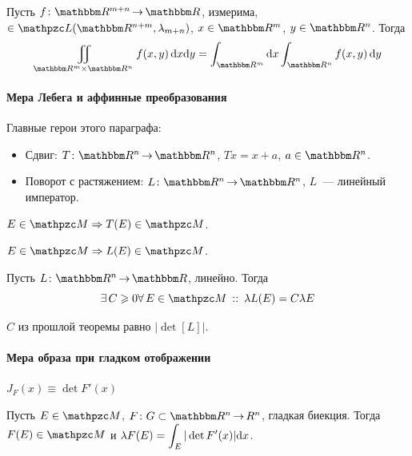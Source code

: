 \documentclass[draft, timbord]{longnotes}
\begin{document}
\begin{thrm}[Фубини]\label{thrm:meas::mult::fub}
  Пусть $f\colon \R^{m+n} \to \R$, измерима, $\in \summb(\R^{n+m}, \lambda_{m+n})$,
  $x\in \R^m$, $y \in \R^n$. Тогда
  \[
    \iint_{\R^m \times \R^n} f(x,y) \, \del x\del y 
    = \int_{\R^m} \del x \int_{\R^n} f(x,y) \, \del y
  \]
\end{thrm}

\paragraph{Мера Лебега и аффинные преобразования}
\label{par:meas::aff}

Главные герои этого параграфа:

\begin{itemize}[$\bigcirc$]
  \item Сдвиг: $T \colon \R^n \to \R^n$, $Tx = x+a$, $a\in \R^n$.
  \item Поворот с растяжением: $L \colon \R^n \to \R^n$, $L$~--- линейный император.
\end{itemize}

\begin{stat}\label{stat:meas::aff::shiftmeas}
  $E \in \lebesgue \Rightarrow T(E) \in \lebesgue$. 
\end{stat}
\begin{stat}\label{stat:meas::aff::linmeas}
  $E \in \lebesgue \Rightarrow L(E) \in \lebesgue$. 
\end{stat}

\begin{stat}\label{stat:meas::aff::disturb}
  Пусть $L \colon \R^n \to \R$, линейно. Тогда 
  \[
    \exists\, C \geqslant 0 \forall\, E \in \lebesgue \holds \lambda L(E) = C \lambda E
  \]
\end{stat}

\begin{thrm}\label{thrm:meas::aff::deter}
  $C$ из прошлой теоремы равно $\bigl|\det [L]\bigr|$.
\end{thrm}

\paragraph{Мера образа при гладком отображении}
\label{par:meas::smoothimgmeas}

{\denot $J_F(x) \equiv \det F'(x)$}

\begin{thrm}\label{thrm:meas::smoothimgmeas}
  Пусть $E \in \lebesgue$, $F \colon G \subset \R^n \to R^n$, гладкая биекция.
  Тогда $F(E) \in \lebesgue$ и $\lambda F(E) = \displaystyle\int_E |\det F'(x) |\mathrm{d} x$.
\end{thrm}
\begin{tproof}
  \sour\underdev
\end{tproof}
\end{document}
